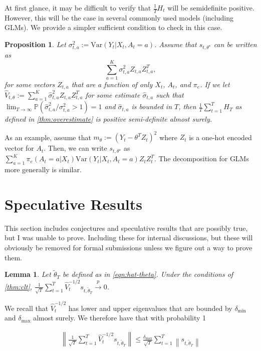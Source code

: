 \documentclass[11pt]{article}
\newcommand{\norm}[1]{\left\lVert#1\right\rVert}
\newtheorem{lemma}{Lemma}
\newtheorem{proposition}{Proposition}
\begin{document}
\begin{appendix}
{At first glance, it may be difficult to verify that $\frac{1}{T} H_{t}$ will be semidefinite positive. However, this  will be the case in several commonly used models (including GLMs). We provide a simpler sufficient condition to check in this case. 
\begin{proposition} \label{prop:check_cond}
Let $\sigma^{2}_{t,a} :=  \text{Var}(Y_{t} | X_{t},A_{t}=a) $. Assume that $s_{t,\theta^{\star}}$ can be written as 
$$ \sum_{a=1}^{K} \sigma^{2}_{t,a} Z_{t,a}Z_{t,a}^{T},$$
for some vectors $Z_{t,a}$ that are a function of only $X_{t}$, $A_{t}$, and $\pi_e$. If we let $\hat{V}_{t,\theta} := \sum_{a=1}^{K} \hat{\sigma}_{t,a}^{2} Z_{t,a}Z_{t,a}^{T}$ for some estimate $\hat{\sigma}_{t,a}$ such that $\lim_{T\rightarrow \infty}\mathbb{P}\left(\hat{\sigma}_{t,a}^{2} / \sigma^{2}_{t,a} > 1 \right) = 1 $ and $\hat{\sigma}_{t,a}$ is bounded in $T$, then $\frac{1}{T} \sum_{t=1}^{T} H_{T}$ as defined in \cref{thm:overestimate} is positive semi-definite almost surely. 
\end{proposition}
As an example, assume that $m_{\theta} := (Y_{t} - \theta^{T}Z_{t})^{2}$ where $Z_{t}$ is a one-hot encoded vector for $A_{t}$. Then, we can write
$s_{t,\theta^{\star}} $ as $\sum_{a=1}^{K} \pi_{e}(A_{t} =a | X_{t}) \text{Var}(Y_{t} | X_{t},A_{t}=a)Z_{t}Z_{t}^{T} $. The decomposition for GLMs more generally is similar. 


{\color{blue}
\section{Speculative Results}
This section includes conjectures and speculative results that are possibly true, but I was unable to prove. Including these for internal discussions, but these will obviously be removed for formal submissions unless we figure out a way to prove them. 

\begin{lemma}
Let $\tilde{\theta}_{T}$ be defined as in \cref{eqn:hat-theta}. Under the conditions of \cref{thm:clt}, $\frac{1}{\sqrt{T}}\sum_{t=1}^{T} \hat{V}_{t}^{-1/2}s_{t,\tilde{\theta}_{T}} \overset{p}{\to} 0$.
\end{lemma}

We recall that $\hat{V}_{t}^{-1/2}$ has lower and upper eigenvalues that are bounded by  $\delta_{\text{min}}$ and $\delta_{\text{max}}$ almost surely. We therefore have that with probability 1

\begin{align*}
\norm{\frac{1}{\sqrt{T}}\sum_{t=1}^{T} \hat{V}_{t}^{-1/2}s_{t,\tilde{\theta}_{T}} } \le \frac{\delta_{\text{max}}}{\sqrt{T}} \sum_{t=1}^{T} \norm{s_{t,\tilde{\theta}_{T}}}
\end{align*}

}}
\end{appendix}
\end{document}

